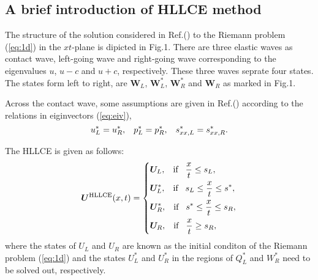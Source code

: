\documentclass{article}
\theoremstyle{plain}\newtheorem{definition}{\sc{Definition}}
\theoremstyle{defination}\newtheorem{example}{Example}[section]
\numberwithin{equation}{section}
\numberwithin{table}{section}
\begin{document}
  \subsection{ A  brief  introduction of HLLCE method \cite{}}

  The structure of the solution considered in Ref.(\cite{}) to the Riemann problem (\ref{eq:1d}) in the $xt$-plane  is dipicted in Fig.1. There are three elastic  waves as contact wave, left-going wave and  right-going  wave  corresponding to the eigenvalues $u$, $u-c$ and $u+c$, respectively. These three waves seprate four  states. The states  form left to right, are  $\bm{W}_L$, $\bm{W}_L^*$, $\bm{W}_R^* $ and $\bm{W}_R$ as marked in Fig.1.

  Across the contact wave, some assumptions are given in Ref.(\cite{}) according to the relations in eiginvectors (\ref{eq:eiv}), 
  \begin{equation}
	u_L^* = u_R^*, \hspace{0.3cm} p_L^* = p_R^*, \hspace{0.3cm} s_{xx,L}^* = s_{xx,R}^*.
  \end{equation}

  The HLLCE is given as follows:
  \begin{equation}\label{eq:HLLCE}
	\bm{U}^{\text{HLLCE}}(x,t) = \left\{ \begin{aligned}
		& \bm{U}_L, \hspace{0.3cm} \text{if} \hspace{0.3cm} \frac{x}{t}\le s_L, \\
		& \bm{U}_L^*, \hspace{0.3cm} \text{if} \hspace{0.3cm} s_L\le \frac{x}{t} \le s^*, \\
		& \bm{U}_R^*, \hspace{0.3cm} \text{if} \hspace{0.3cm} s^*\le \frac{x}{t} \le s_R,\\
		& \bm{U}_R, \hspace{0.3cm} \text{if} \hspace{0.3cm} \frac{x}{t}\ge s_R, \\
	  \end{aligned}
	\right.
  \end{equation}
  where the states of $U_L$ and $U_R$ are known as the initial conditon of the Riemann problem (\ref{eq:1d}) and the states $U_L^*$ and $U_R^*$ in the regions of $Q_L^*$ and $W_R^*$ need to be solved out, respectively.
\end{document}
